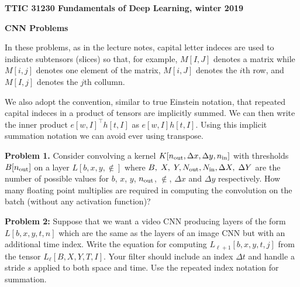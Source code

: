 \documentclass{article}
\newcommand{\solution}[1]{\bigskip {\color{red} {\bf Solution}: #1}}
\begin{document}
\centerline{\bf TTIC 31230 Fundamentals of Deep Learning, winter 2019}

\medskip
\centerline{\bf CNN Problems}

In these problems, as in the lecture notes, capital letter indeces are used to indicate subtensors (slices) so that, for example,  $M[I,J]$ denotes a matrix
while $M[i,j]$ denotes one element of the matrix, $M[i,J]$ denotes the $i$th row, and $M[I,j]$ denotes the $j$th collumn.

\medskip
We also adopt the convention, similar to true Einstein notation, that repeated capital indeces in a product of tensors are implicitly summed.  We can then write
the inner product $e[w,I]^\top h[t,I]$ as $e[w,I]h[t,I]$.  Using this implicit summation notation we can avoid ever using transpose.

\bigskip
{\bf Problem 1.}  Consider convolving a kernel $K[n_{\mathrm{out}},\Delta x, \Delta y,n_{\mathrm{in}}]$  with thresholds $B[n_{\mathrm{out}}]$ on a layer $L[b,x,y,\nin]$ where $B,\;X,\;Y,N_{\mathrm{out}}, N_{\mathrm{in}},\Delta X,\;\Delta Y$
are the number of possible values for $b$, $x$, $y$, $n_{\mathrm{out}}$, $\nin$, $\Delta x$ and $\Delta y$ respectively.
How many floating point multiplies are required
in computing the convolution on the batch (without any activation function)?

\solution{$$BXY\;\Delta X\;\Delta Y \;\Nout \;\Nin$$}

\bigskip
{\bf Problem 2:} Suppose that we want a video CNN producing layers of the form $L[b,x,y,t,n]$ which are the same as the layers of an image CNN but with an additional time index.
Write the equation for computing $L_{\ell+1}[b,x,y,t,j]$ from the tensor $L_\ell[B,X,Y,T,I]$.  Your filter should include an index $\Delta t$ and handle a stride $s$ applied
to both space and time. Use the repeated index notation for summation.

\solution{
  $$L_{\ell + 1}[b,x,y,t,\nout] = \sigma(K_{\ell+1}[\nout \Delta X, \Delta Y, \Delta T, \Nin] L_\ell[b, sx+ \Delta X, sy + \Delta Y, st + \Delta T, \Nin]- B[\nout])$$
  }
\end{document}
